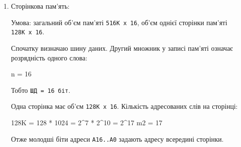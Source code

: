 \documentclass[
  11pt,
]{article}
\newenvironment{Shaded}{}{}
\newcommand{\NormalTok}[1]{#1}
\begin{document}
\begin{enumerate}
  Регістр \texttt{C} у цьому варіанті не змінюється, бо гілка з \texttt{C\ =\ S} виконується тільки при переповненні.

  Ознаки для \texttt{S}:

\begin{Shaded}
\begin{Highlighting}[]
\NormalTok{S = 000000110}
\NormalTok{zero\_flag     = 0, бо S не дорівнює нулю}
\NormalTok{overflow\_flag = 0, бо переповнення не було}
\NormalTok{sign\_flag     = 0, бо знаковий біт дорівнює 0}
\end{Highlighting}
\end{Shaded}

  Результат у прямому коді: \texttt{00000110\_2\ =\ +6}.

  Перевірка десятковими еквівалентами:

\begin{Shaded}
\begin{Highlighting}[]
\NormalTok{R1 = +16}
\NormalTok{R2 = +10}
\NormalTok{S  = 16 + 10 = 26}
\NormalTok{S >>> 2 = 26 / 4 = 6}
\end{Highlighting}
\end{Shaded}

  У Google Forms для \texttt{RESULT}: \texttt{00}.
\item
  Сторінкова пам'ять:

  Умова: загальний об'єм пам'яті \texttt{516K\ x\ 16}, об'єм однієї сторінки пам'яті \texttt{128K\ x\ 16}.

  Спочатку визначаю шину даних. Другий множник у записі пам'яті означає розрядність одного слова:

\begin{Shaded}
\begin{Highlighting}[]
\NormalTok{n = 16}
\end{Highlighting}
\end{Shaded}

  Тобто \texttt{ШД\ =\ 16\ біт}.

  Одна сторінка має об'єм \texttt{128K\ x\ 16}. Кількість адресованих слів на сторінці:

\begin{Shaded}
\begin{Highlighting}[]
\NormalTok{128K = 128 * 1024 = 2\^{}7 * 2\^{}10 = 2\^{}17}
\NormalTok{m2 = 17}
\end{Highlighting}
\end{Shaded}

  Отже молодші біти адреси \texttt{A16..A0} задають адресу всередині сторінки.


\end{enumerate}
\end{document}

